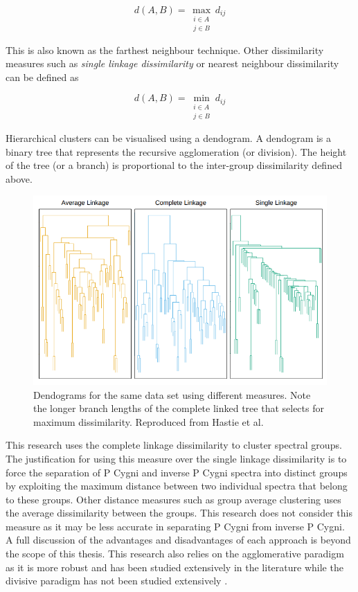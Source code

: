 \begin{equation}
    d(A,B) = \max_{\substack{i \in A \\ j \in B}} d_{ij}
\end{equation}

This is also known as the farthest neighbour technique. Other dissimilarity measures such as \emph{single linkage dissimilarity} or nearest neighbour dissimilarity can be defined as

\begin{equation}
    d(A,B) = \min_{\substack{i \in A \\ j \in B}} d_{ij}
\end{equation}

Hierarchical clusters can be visualised using a dendogram. A dendogram is a binary tree that represents the recursive agglomeration (or division). The height of the tree (or a branch) is proportional to the inter-group dissimilarity defined above. 

\begin{figure}[h]
\centering
\includegraphics[scale=0.60]{figures/complete linkage.png}
\caption{Dendograms for the same data set using different measures. Note the longer branch lengths of the complete linked tree that selects for maximum dissimilarity. Reproduced from Hastie et al.\cite{hastie2009elements}}
\end{figure}

This research uses the complete linkage dissimilarity to cluster spectral groups. The justification for using this measure over the single linkage dissimilarity is to force the separation of P Cygni and inverse P Cygni spectra into distinct groups by exploiting the maximum distance between two individual spectra that belong to these groups. Other distance measures such as group average clustering uses the average dissimilarity between the groups. This research does not consider this measure as it may be less accurate in separating P Cygni from inverse P Cygni. A full discussion of the advantages and disadvantages of each approach is beyond the scope of this thesis. This research also relies on the agglomerative paradigm as it is more robust and has been studied extensively in the literature while the divisive paradigm has not been studied extensively \cite{hastie2009elements}.

